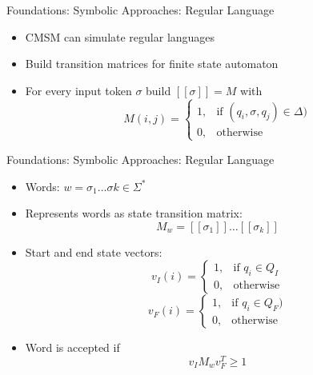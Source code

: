 \documentclass[12pt,a4paper]{beamer}
\begin{document}




\begin{frame}{Foundations: Symbolic Approaches: Regular Language}
\begin{itemize}
\item CMSM can simulate regular languages
\item Build transition matrices for finite state automaton
\item For every input token $\sigma$ build $[[\sigma]] = M$ with
$$ M(i,j) = \left\{\begin{array}{cl} 1, & \mbox{if } (q_{i},\sigma,q_{j}) \in \Delta) \\ 0, & \mbox{otherwise} \end{array}\right.  $$
\end{itemize}
\end{frame}


\begin{frame}{Foundations: Symbolic Approaches: Regular Language}
\begin{itemize}
\item Words: $w = \sigma_{1} \ldots \sigma{k} \in \Sigma^{*}$ 
\item Represents words as state transition matrix:
$$ M_{w} = [[\sigma_{1}]]\ldots [[\sigma_{k}]]  $$
\item Start and end state vectors:
$$ v_{I}(i) = \left\{\begin{array}{cl} 1, & \mbox{if } q_{i} \in Q_{I} \\ 0, & \mbox{otherwise} \end{array}\right. $$ 
$$ v_{F}(i) = \left\{\begin{array}{cl} 1, & \mbox{if } q_{i} \in Q_{F}) \\ 0, & \mbox{otherwise} \end{array}\right. $$
\item Word is accepted if
$$ v_{I}M_{w}v_{F}^{T} \ge 1 $$
\end{itemize}
\end{frame}
\end{document}
